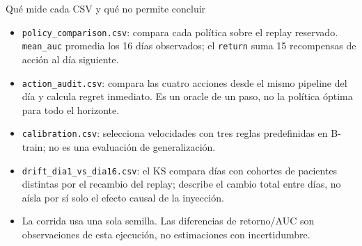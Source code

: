 \documentclass[aspectratio=169,10pt]{beamer}
\begin{document}
\begin{frame}{Qué mide cada CSV y qué no permite concluir}
\begin{itemize}
  \item \texttt{policy\_comparison.csv}: compara cada política sobre el replay
        reservado. \texttt{mean\_auc} promedia los 16 días observados; el
        \texttt{return} suma 15 recompensas de acción al día siguiente.
  \item \texttt{action\_audit.csv}: compara las cuatro acciones desde el mismo
        pipeline del día y calcula regret inmediato. Es un oracle de un paso,
        no la política óptima para todo el horizonte.
  \item \texttt{calibration.csv}: selecciona velocidades con tres reglas
        predefinidas en B-train; no es una evaluación de generalización.
  \item \texttt{drift\_dia1\_vs\_dia16.csv}: el KS compara días con cohortes
        de pacientes distintas por el recambio del replay; describe el cambio
        total entre días, no aísla por sí solo el efecto causal de la inyección.
  \item La corrida usa una sola semilla. Las diferencias de retorno/AUC son
        observaciones de esta ejecución, no estimaciones con incertidumbre.
\end{itemize}
\end{frame}
\end{document}
